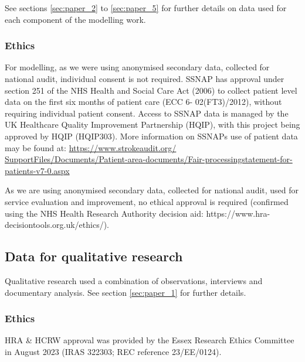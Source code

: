 See sections \ref{sec:paper_2} to \ref{sec:paper_5} for further details on data used for each component of the modelling work.

\subsubsection{Ethics}

For modelling, as we were using anonymised secondary data, collected for national audit, individual consent is not required. SSNAP has approval under section 251 of the NHS Health and Social Care Act (2006) to collect patient level data on the first six months of patient care (ECC 6- 02(FT3)/2012), without requiring individual patient consent. Access to SSNAP data is managed by the UK Healthcare Quality Improvement Partnership (HQIP), with this project being approved by HQIP (HQIP303). More information on SSNAPs use of patient data may be found at: \url{https://www.strokeaudit.org/ SupportFiles/Documents/Patient-area-documents/Fair-processingstatement-for-patients-v7-0.aspx}

As we are using anonymised secondary data, collected for national audit, used for service evaluation and improvement, no ethical approval is required (confirmed using the NHS Health Research Authority decision aid: https://www.hra-decisiontools.org.uk/ethics/).

\subsection{Data for qualitative research}

Qualitative research used a combination of observations, interviews and documentary analysis. See section \ref{sec:paper_1} for further details.

\subsubsection{Ethics}

HRA \& HCRW approval was provided by the Essex Research Ethics Committee in August 2023 (IRAS 322303; REC reference 23/EE/0124).